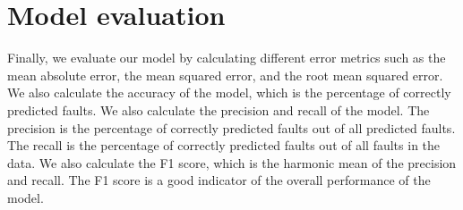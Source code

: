 \section{Model evaluation}

Finally, we evaluate our model by calculating different error metrics such as the mean absolute error, the mean squared error, and the root mean squared error. We also calculate the accuracy of the model, which is the percentage of correctly predicted faults. We also calculate the precision and recall of the model. The precision is the percentage of correctly predicted faults out of all predicted faults. The recall is the percentage of correctly predicted faults out of all faults in the data. We also calculate the F1 score, which is the harmonic mean of the precision and recall. The F1 score is a good indicator of the overall performance of the model.
